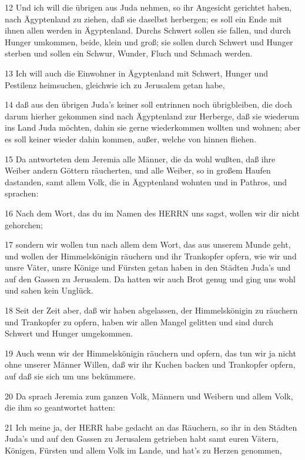 \par 12 Und ich will die übrigen aus Juda nehmen, so ihr Angesicht gerichtet haben, nach Ägyptenland zu ziehen, daß sie daselbst herbergen; es soll ein Ende mit ihnen allen werden in Ägyptenland. Durchs Schwert sollen sie fallen, und durch Hunger umkommen, beide, klein und groß; sie sollen durch Schwert und Hunger sterben und sollen ein Schwur, Wunder, Fluch und Schmach werden.
\par 13 Ich will auch die Einwohner in Ägyptenland mit Schwert, Hunger und Pestilenz heimsuchen, gleichwie ich zu Jerusalem getan habe,
\par 14 daß aus den übrigen Juda's keiner soll entrinnen noch übrigbleiben, die doch darum hierher gekommen sind nach Ägyptenland zur Herberge, daß sie wiederum ins Land Juda möchten, dahin sie gerne wiederkommen wollten und wohnen; aber es soll keiner wieder dahin kommen, außer, welche von hinnen fliehen.
\par 15 Da antworteten dem Jeremia alle Männer, die da wohl wußten, daß ihre Weiber andern Göttern räucherten, und alle Weiber, so in großem Haufen dastanden, samt allem Volk, die in Ägyptenland wohnten und in Pathros, und sprachen:
\par 16 Nach dem Wort, das du im Namen des HERRN uns sagst, wollen wir dir nicht gehorchen;
\par 17 sondern wir wollen tun nach allem dem Wort, das aus unserem Munde geht, und wollen der Himmelskönigin räuchern und ihr Trankopfer opfern, wie wir und unsre Väter, unsre Könige und Fürsten getan haben in den Städten Juda's und auf den Gassen zu Jerusalem. Da hatten wir auch Brot genug und ging uns wohl und sahen kein Unglück.
\par 18 Seit der Zeit aber, daß wir haben abgelassen, der Himmelskönigin zu räuchern und Trankopfer zu opfern, haben wir allen Mangel gelitten und sind durch Schwert und Hunger umgekommen.
\par 19 Auch wenn wir der Himmelskönigin räuchern und opfern, das tun wir ja nicht ohne unserer Männer Willen, daß wir ihr Kuchen backen und Trankopfer opfern, auf daß sie sich um uns bekümmere.
\par 20 Da sprach Jeremia zum ganzen Volk, Männern und Weibern und allem Volk, die ihm so geantwortet hatten:
\par 21 Ich meine ja, der HERR habe gedacht an das Räuchern, so ihr in den Städten Juda's und auf den Gassen zu Jerusalem getrieben habt samt euren Vätern, Königen, Fürsten und allem Volk im Lande, und hat's zu Herzen genommen,
